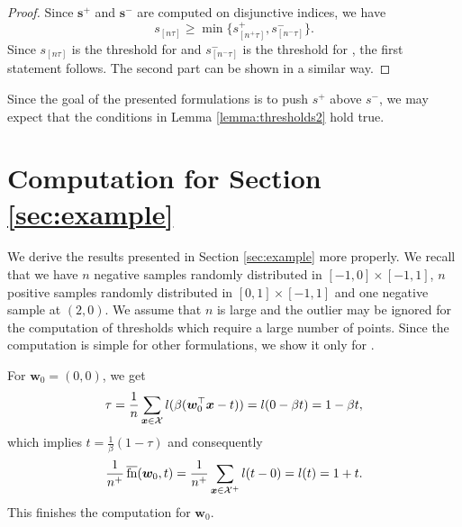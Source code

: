 \begin{proof}
  Since $\bm{s}^+$ and $\bm{s}^-$ are computed on disjunctive indices, we have
  \begin{equation*}
    s_{[n\tau]} \ge \min\{s_{[n^+\tau]}^+, s_{[n^-\tau]}^-\}.
  \end{equation*}
  Since $s_{[n\tau]}$ is the threshold for \Grill and $s_{[n^-\tau]}^-$ is the threshold for \GrillNP, the first statement follows. The second part can be shown in a similar way.
\end{proof}
  
\noindent Since the goal of the presented formulations is to push $s^+$ above $s^-$, we may expect that the conditions in Lemma \ref{lemma:thresholds2} hold true. 
  
\section{Computation for Section \ref{sec:example}}\label{app:example}

We derive the results presented in Section \ref{sec:example} more properly. We recall that we have $n$ negative samples randomly distributed in $[-1,0]\times[-1,1]$, $n$ positive samples randomly distributed in $[0,1]\times[-1,1]$ and one negative sample at $(2,0)$. We assume that $n$ is large and the outlier may be ignored for the computation of thresholds which require a large number of points. Since the computation is simple for other formulations, we show it only for \PatMat.
  
For $\bm{w}_0=(0,0)$, we get
\begin{equation*}
  \tau
  = \frac{1}{n}\sum_{\bm{x} \in \mathcal{X}}l(\beta(\bm{w}_0^\top \bm{x}-t))
  = l(0-\beta t) = 1-\beta t,
\end{equation*}
which implies $t=\frac{1}{\beta}(1-\tau)$ and consequently
\begin{equation*}
  \frac{1}{n^+}\operatorname{\overline{fn}}(\bm{w}_0,t)
  = \frac{1}{n^+}\sum_{\bm{x} \in \mathcal{X}^+} l(t-0)
  = l(t) = 1+t.
\end{equation*}
This finishes the computation for $\bm{w}_0$.

